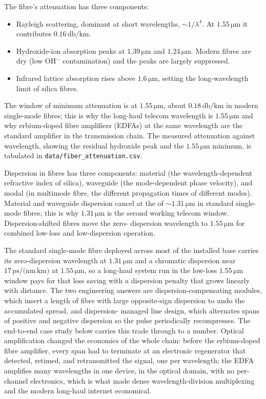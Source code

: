The fibre's attenuation has three components:
\begin{itemize}[leftmargin=*]
  \item Rayleigh scattering, dominant at short wavelengths, $\sim
    1/\lambda^{4}$. At $1.55\,\si{\micro\meter}$ it contributes
    $0.16\,\si{\decibel\per\kilo\meter}$.
  \item Hydroxide-ion absorption peaks at $1.39\,\si{\micro\meter}$
    and $1.24\,\si{\micro\meter}$. Modern fibres are dry (low OH$^{-}$
    contamination) and the peaks are largely suppressed.
  \item Infrared lattice absorption rises above $1.6\,\si{\micro
    \meter}$, setting the long-wavelength limit of silica fibres.
\end{itemize}
The window of minimum attenuation is at $1.55\,\si{\micro\meter}$,
about $0.18\,\si{\decibel\per\kilo\meter}$ in modern single-mode
fibres; this is why the long-haul telecom wavelength is
$1.55\,\si{\micro\meter}$ and why erbium-doped fibre amplifiers
(EDFAs) at the same wavelength are the standard amplifier in the
transmission chain. The measured attenuation against wavelength,
showing the residual hydroxide peak and the $1.55\,\si{\micro\meter}$
minimum, is tabulated in \texttt{data/fiber\_attenuation.csv}.

Dispersion in fibres has three components: material (the
wavelength-dependent refractive index of silica), waveguide (the
mode-dependent phase velocity), and modal (in multimode fibre, the
different propagation times of different modes). Material and
waveguide dispersion cancel at the  of $\sim 1.31\,\si{\micro\meter}$ in standard single-
mode fibres; this is why $1.31\,\si{\micro\meter}$ is the second
working telecom window. Dispersion-shifted fibres move the zero-
dispersion wavelength to $1.55\,\si{\micro\meter}$ for combined
low-loss and low-dispersion operation.

The standard single-mode fibre deployed across most of the installed base
carries its zero-dispersion wavelength at $1.31\,\si{\micro\meter}$ and a
chromatic dispersion near $17\,\si{\pico\second/(\nano\meter\,\kilo\meter)}$
at $1.55\,\si{\micro\meter}$, so a long-haul system run in the low-loss
$1.55\,\si{\micro\meter}$ window pays for that loss saving with a dispersion
penalty that grows linearly with distance. The two engineering answers are
dispersion-compensating modules, which insert a length of fibre with large
opposite-sign dispersion to undo the accumulated spread, and dispersion-
managed line design, which alternates spans of positive and negative
dispersion so the pulse periodically recompresses. The end-to-end case study
below carries this trade through to a number. Optical amplification changed
the economics of the whole chain: before the erbium-doped fibre amplifier,
every span had to terminate at an electronic regenerator that detected,
retimed, and retransmitted the signal, one per wavelength; the EDFA amplifies
many wavelengths in one device, in the optical domain, with no per-channel
electronics, which is what made dense wavelength-division multiplexing and the
modern long-haul internet economical.


